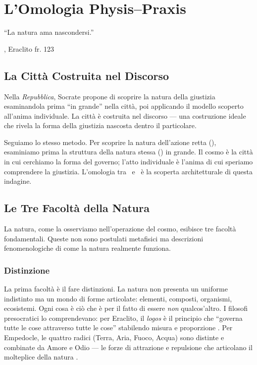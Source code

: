 \chapter{L'Omologia Physis--Praxis}

\epigraph{``La natura ama nascondersi.''}{\textcite{kirk1983presocratic}, Eraclito fr. 123}

\section{La Citt\`a Costruita nel Discorso}

Nella \emph{Repubblica}, Socrate propone di scoprire la natura della
giustizia esaminandola prima ``in grande'' nella citt\`a, poi applicando
il modello scoperto all'anima individuale. La citt\`a \`e costruita nel
discorso --- una costruzione ideale che rivela la forma della giustizia
nascosta dentro il particolare.

Seguiamo lo stesso metodo. Per scoprire la natura dell'azione retta
(\praxis), esaminiamo prima la struttura della natura stessa (\physis)
in grande. Il cosmo \`e la citt\`a in cui cerchiamo la forma del governo;
l'atto individuale \`e l'anima di cui speriamo comprendere la giustizia.
L'omologia tra \physis\ e \praxis\ \`e la scoperta architetturale di
questa indagine.

\section{Le Tre Facolt\`a della Natura}

La natura, come la osserviamo nell'operazione del cosmo, esibisce tre
facolt\`a fondamentali. Queste non sono postulati metafisici ma
descrizioni fenomenologiche di come la natura realmente funziona.

\subsection{Distinzione}

La prima facolt\`a \`e il fare distinzioni. La natura non presenta un
uniforme indistinto ma un mondo di forme articolate: elementi, composti,
organismi, ecosistemi. Ogni cosa \`e ci\`o che \`e per il fatto di essere
\emph{non} qualcos'altro. I filosofi presocratici lo comprendevano: per
Eraclito, il \emph{logos} \`e il principio che ``governa tutte le cose
attraverso tutte le cose'' stabilendo misura e proporzione
\parencite{kirk1983presocratic}. Per
Empedocle, le quattro radici (Terra, Aria, Fuoco, Acqua) sono distinte e
combinate da Amore e Odio --- le forze di attrazione e repulsione che
articolano il molteplice della natura \parencite{kirk1983presocratic}.

